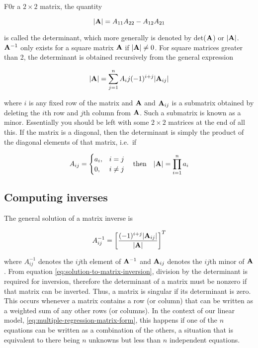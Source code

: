 \documentclass[
]{book}
\begin{document}
F0r a \(2 \times 2\) matrix, the quantity

\begin{equation}
    |\mathbf{A}| = A_{11}A_{22} - A_{12}A_{21}
    \label{eq:determinant-of-twobytwo-matrix}
\end{equation}

is called the determinant, which more generally is denoted by det(\(\mathbf{A}\)) or \(|\mathbf{A}|\). \(\mathbf{A}^{-1}\) only exists for a square matrix \(\mathbf{A}\) if \(|\mathbf{A}| \neq 0\). For square matrices greater than 2, the determinant is obtained recursively from the general expression

\begin{equation}
    |\mathbf{A}| = \sum^n_{j=1} {A_ij}(-1)^{i+j}|\mathbf{A}_{ij}|
    \label{eq:general-determinant-equation}
\end{equation}

where \(i\) is any fixed row of the matrix and \(\mathbf{A}\) and \(\mathbf{A}_{ij}\) is a submatrix obtained by deleting the \(i\)th row and \(j\)th column from \(\mathbf{A}\). Such a submatrix is known as a minor. Essentially you should be left with some \(2 \times 2\) matrices at the end of all this. If the matrix is a diagonal, then the determinant is simply the product of the diagonal elements of that matrix, i.e.~if

\begin{equation}
    A_{ij} = 
    \begin{cases}
        a_i, & i = j\\
        0, & i \neq j
    \end{cases}
    \ \ \ \mathrm{then} \ \ \ 
    |\mx{A}| = \prod^n_{i=1}a_{i}
    \notag
\end{equation}

\hypertarget{computing-inverses}{%
\subsection{Computing inverses}\label{computing-inverses}}

The general solution of a matrix inverse is

\begin{equation}
    A^{-1}_{ij} = \left[\frac{(-1)^{i+j}|\mathbf{A}_{ij}|} {|\mathbf{A}|} \right]^T
    \label{eq:solution-to-matrix-inversion}
\end{equation}

where \(A^{-1}_{ij}\) denotes the \(ij\)th element of \(\mathbf{A}^{-1}\) and \(\mathbf{A}_{ij}\) denotes the \(ij\)th minor of \(\mathbf{A}\). From equation \eqref{eq:solution-to-matrix-inversion}, division by the determinant is required for inversion, therefore the determinant of a matrix must be nonzero if that matrix can be inverted. Thus, a matrix is singular if its determinant is zero. This occurs whenever a matrix contains a row (or column) that can be written as a weighted sum of any other rows (or columns). In the context of our linear model, \eqref{eq:multiple-regression-matrix-form}, this happens if one of the \(n\) equations can be written as a combination of the others, a situation that is equivalent to there being \(n\) unknowns but less than \(n\) independent equations.
\end{document}
